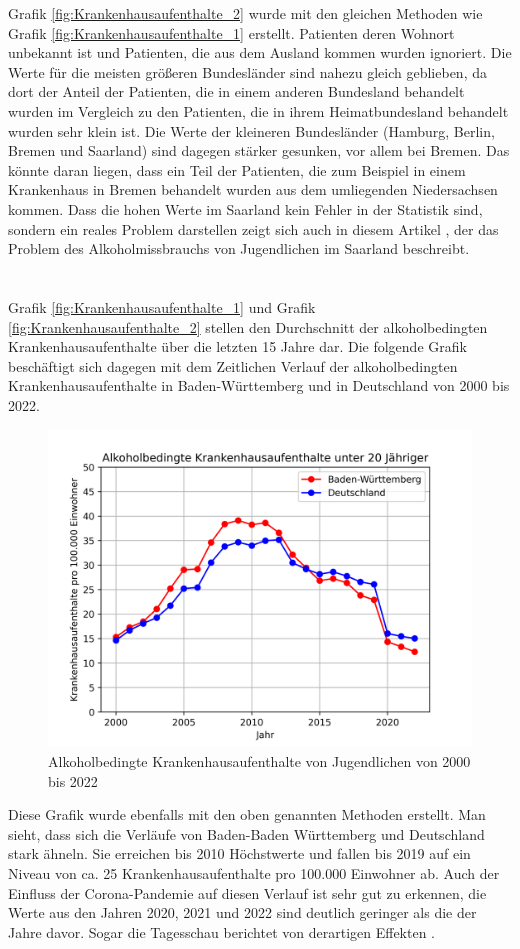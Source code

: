 \documentclass[12pt]{article}
\begin{document}
Grafik \ref{fig:Krankenhausaufenthalte_2} wurde mit den gleichen Methoden wie Grafik \ref{fig:Krankenhausaufenthalte_1} erstellt. Patienten deren Wohnort unbekannt ist und Patienten, die aus dem Ausland kommen wurden ignoriert. 
Die Werte für die meisten größeren Bundesländer sind nahezu gleich geblieben, da dort der Anteil der Patienten, die in einem anderen Bundesland behandelt wurden im Vergleich zu den Patienten, die in ihrem Heimatbundesland behandelt wurden sehr klein ist. Die Werte der kleineren Bundesländer (Hamburg, Berlin, Bremen und Saarland) sind dagegen stärker gesunken, vor allem bei Bremen. Das könnte daran liegen, dass ein Teil der Patienten, die zum Beispiel in einem Krankenhaus in Bremen behandelt wurden aus dem umliegenden Niedersachsen kommen. Dass die hohen Werte im Saarland kein Fehler in der Statistik sind, sondern ein reales Problem darstellen zeigt sich auch in diesem Artikel \autocite{noauthor_saarland_nodate}, der das Problem des Alkoholmissbrauchs von Jugendlichen im Saarland beschreibt. 
\\\\\\
Grafik \ref{fig:Krankenhausaufenthalte_1} und Grafik \ref{fig:Krankenhausaufenthalte_2} stellen den Durchschnitt der alkoholbedingten Krankenhausaufenthalte über die letzten 15 Jahre dar. Die folgende Grafik beschäftigt sich dagegen mit dem Zeitlichen Verlauf der alkoholbedingten Krankenhausaufenthalte in Baden-Württemberg und in Deutschland von 2000 bis 2022.
\begin{figure}[H]
    \centering
    \includegraphics[scale=.7]{"assets/Alkohol_BW_Ges.png"}
    \caption{Alkoholbedingte Krankenhausaufenthalte von Jugendlichen von 2000 bis 2022}
    \label{fig:Krankenhausaufenthalte_3}
\end{figure}
Diese Grafik wurde ebenfalls mit den oben genannten Methoden erstellt.
Man sieht, dass sich die Verläufe von Baden-Baden Württemberg und Deutschland stark ähneln. Sie erreichen bis 2010 Höchstwerte und fallen bis 2019 auf ein Niveau von ca. 25 Krankenhausaufenthalte pro 100.000 Einwohner ab. Auch der Einfluss der Corona-Pandemie auf diesen Verlauf ist sehr gut zu erkennen, die Werte aus den Jahren 2020, 2021 und 2022 sind deutlich geringer als die der Jahre davor. Sogar die Tagesschau berichtet von derartigen Effekten \autocite{tagesschaude_weniger_nodate}.
\end{document}
